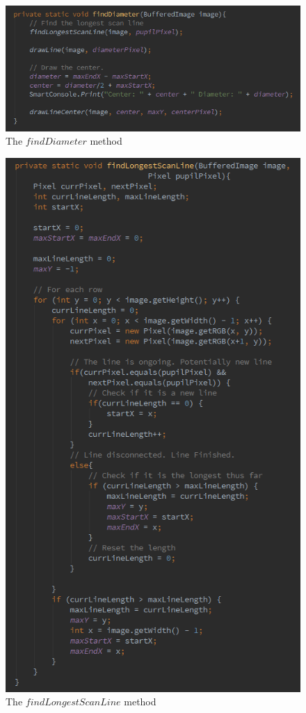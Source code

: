 \documentclass{article}
\begin{document}
%
%
\begin{figure}[H]
\centering

  \includegraphics[width=0.9\linewidth]{res/pupil/alg/findDiameter.png}

\caption{The $findDiameter$ method}
\label{fig:pup_alg_diameter}
\end{figure}


%
%
\begin{figure}[H]
\centering

  \includegraphics[width=0.9\linewidth]{res/pupil/alg/findLongestScanLine.png}

\caption{The $findLongestScanLine$ method}
\label{fig:pup_alg_scan}
\end{figure}
\end{document}
